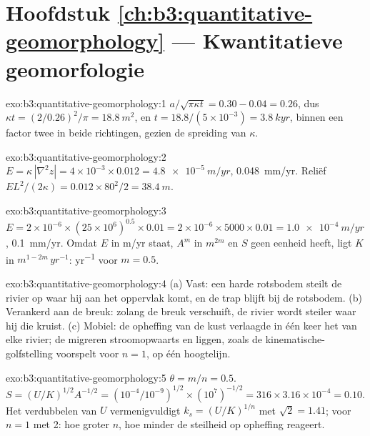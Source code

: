 \section*{Hoofdstuk \ref{ch:b3:quantitative-geomorphology} --- Kwantitatieve geomorfologie}

\begin{solution}{exo:b3:quantitative-geomorphology:1}
$a/\sqrt{\pi\kappa t} = 0.30 - 0.04 = 0.26$, dus $\kappa t = (2/0.26)^2/\pi =
\qty{18.8}{m^2}$, en $t = 18.8/(5\times10^{-3}) = \qty{3.8}{kyr}$, binnen een
factor twee in beide richtingen, gezien de spreiding van $\kappa$.
\end{solution}

\begin{solution}{exo:b3:quantitative-geomorphology:2}
$E = \kappa\,|\nabla^2 z| = 4\times10^{-3}\times0.012 =
\qty{4.8e-5}{m/yr}$, \qty{0.048}{mm/yr}. Reliëf $E L^2/(2\kappa) =
0.012\times80^2/2 = \qty{38.4}{m}$.
\end{solution}

\begin{solution}{exo:b3:quantitative-geomorphology:3}
$E = 2\times10^{-6}\times(25\times10^6)^{0.5}\times0.01 = 2\times10^{-6}
\times5000\times0.01 = \qty{1.0e-4}{m/yr}$, \qty{0.1}{mm/yr}. Omdat $E$
in \unit{m/yr} staat, $A^m$ in $\unit{m}^{2m}$ en $S$ geen eenheid heeft, ligt $K$ in
$\unit{m}^{1-2m}\,\unit{yr^{-1}}$: \unit{yr^{-1}} voor $m = 0.5$.
\end{solution}

\begin{solution}{exo:b3:quantitative-geomorphology:4}
(a) Vast: een harde rotsbodem steilt de rivier op waar hij aan het oppervlak komt, en de trap
blijft bij de rotsbodem. (b) Verankerd aan de breuk: zolang de breuk verschuift,
de rivier wordt steiler waar hij die kruist. (c) Mobiel: de opheffing van de
kust verlaagde in één keer het  van elke rivier; de 
migreren stroomopwaarts en liggen, zoals de kinematische-golfstelling voorspelt voor $n
= 1$, op één hoogtelijn.
\end{solution}

\begin{solution}{exo:b3:quantitative-geomorphology:5}
$\theta = m/n = 0.5$. $S = (U/K)^{1/2}A^{-1/2} = (10^{-4}/10^{-9})^{1/2}
\times(10^7)^{-1/2} = 316\times3.16\times10^{-4} = 0.10$. Het verdubbelen van
$U$ vermenigvuldigt $k_s = (U/K)^{1/n}$ met $\sqrt2 = 1.41$; voor $n = 1$ met 2: hoe
groter $n$, hoe minder de steilheid op opheffing reageert.
\end{solution}

